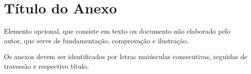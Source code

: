 \chapter{Título do Anexo}

Elemento opcional, que consiste em texto ou documento não elaborado pelo autor, que serve de fundamentação, comprovação e ilustração.

Os anexos devem ser identificados por letras maiúsculas consecutivas, seguidas de travessão e respectivo título.